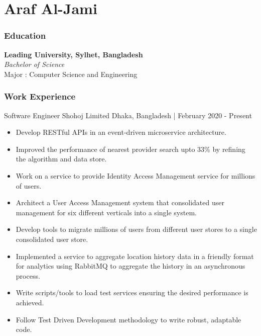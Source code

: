 \documentclass{resumestyle}
\begin{document}
\large%

\part{Araf Al-Jami}

\section{Education}%

\textbf{Leading University, Sylhet, Bangladesh}\\%
\textit{Bachelor of Science}\\%
Major : Computer Science and Engineering\\%

\section{Work Experience}%
    \worksubsection%
        {Software Engineer}%
        {Shohoj Limited}%
        {Dhaka, Bangladesh | February 2020 - Present}%
    
    \begin{itemize}[labelsep=4pt,leftmargin=*,topsep=5pt,partopsep=0pt,itemsep=1pt]%
        \item Develop RESTful APIs in an event-driven microservice architecture.%
        \item Improved the performance of nearest provider search upto 33\% by refining the algorithm and data store.
        \item Work on a service to provide Identity Access Management service for millions of users.%
        \item Architect a User Access Management system that consolidated user management for six different verticals into a single system.%
        \item Develop tools to migrate millions of users from different user stores to a single consolidated user store.%
        \item Implemented a service to aggregate location history data in a friendly format for analytics using RabbitMQ to aggregate the history in an asynchronous process.%
        \item Write scripts/tools to load test services ensuring the desired performance is achieved.%
        \item Follow Test Driven Development methodology to write robust, adaptable code.%
    \end{itemize}%
\end{document}
